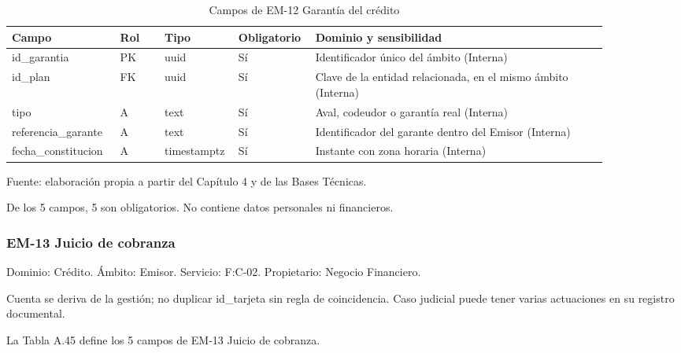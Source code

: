 \documentclass[11pt]{article}
\begin{document}
\begin{table}[htbp]
\caption{Campos de EM-12 Garantía del crédito}\label{tab:d_em12}
\centering
\begin{tabular}{@{}p{0.167\linewidth}p{0.070\linewidth}p{0.079\linewidth}p{0.097\linewidth}p{0.465\linewidth}@{}}
\toprule Campo & Rol & Tipo & Obligatorio & Dominio y sensibilidad \\
\midrule
id\_garantia & PK & uuid & Sí & Identificador único del ámbito (Interna) \\
id\_plan & FK & uuid & Sí & Clave de la entidad relacionada, en el mismo ámbito (Interna) \\
tipo & A & text & Sí & Aval, codeudor o garantía real (Interna) \\
referencia\_garante & A & text & Sí & Identificador del garante dentro del Emisor (Interna) \\
fecha\_constitucion & A & timestamptz & Sí & Instante con zona horaria (Interna) \\
\bottomrule
\end{tabular}
\par\smallskip
{\raggedright Fuente: elaboración propia a partir del Capítulo 4 y de las Bases Técnicas.\par}
\end{table}


De los 5 campos, 5 son obligatorios. No contiene datos personales ni financieros.

\subsubsection{EM-13 Juicio de cobranza}

Dominio: Crédito. Ámbito: Emisor. Servicio: F:C-02. Propietario: Negocio Financiero.

Cuenta se deriva de la gestión; no duplicar id\_tarjeta sin regla de coincidencia. Caso judicial puede tener varias actuaciones en su registro documental.

La Tabla A.45 define los 5 campos de EM-13 Juicio de cobranza.
\end{document}
